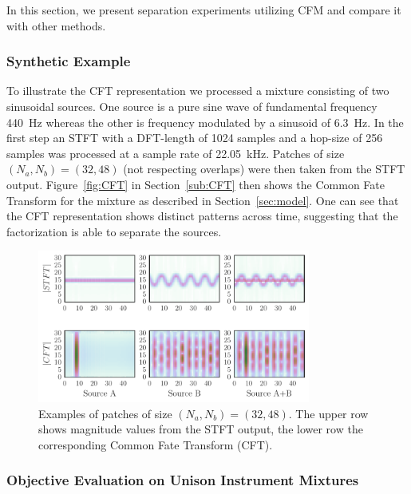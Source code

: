 In this section, we present separation experiments utilizing CFM and compare it with other methods.

\subsubsection{Synthetic Example}
\label{sub:Synthentic_Examples}

To illustrate the CFT representation we processed a mixture consisting of two sinusoidal sources. One source is a pure sine wave of fundamental frequency 440~Hz whereas the other is frequency modulated by a sinusoid of 6.3~Hz. In the first step an STFT with a DFT-length of 1024 samples and a hop-size of 256 samples was processed at a sample rate of 22.05~kHz. Patches of size $(N_a, N_b) = (32, 48)$ (not respecting overlaps) were then taken from the STFT output. Figure~\ref{fig:CFT} in Section~\ref{sub:CFT} then shows the Common Fate Transform for the mixture as described in Section~\ref{sec:model}. One can see that the CFT representation shows distinct patterns across time, suggesting that the factorization is able to separate the sources.

\begin{figure}[b]
\centering
		\includegraphics[width=0.8\textwidth]{Chapters/06_Separation_Unknown/figures/gridplot.pdf}
\caption{Examples of patches of size $(N_a, N_b) = (32, 48)$. The upper row shows magnitude values from the STFT output, the lower row the corresponding Common Fate Transform (CFT).}
\label{fig:gridplot}
\end{figure}

\subsubsection{Objective Evaluation on Unison Instrument Mixtures}

